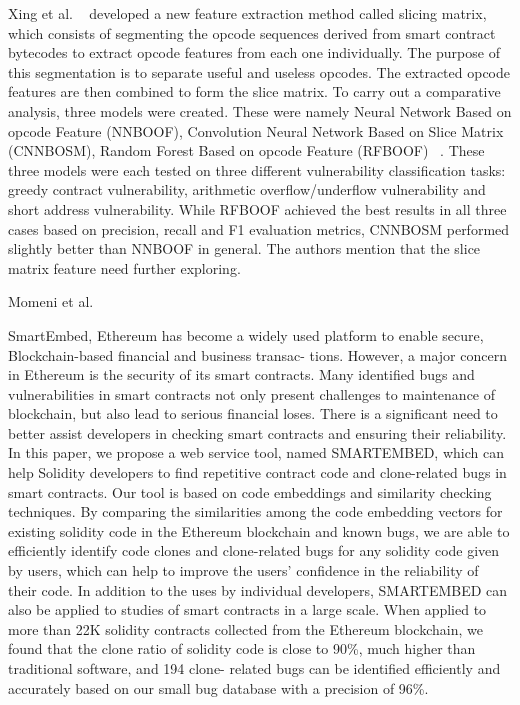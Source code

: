 Xing et al. ~\cite{hu2021comprehensive} developed a new feature extraction method called slicing matrix, which consists of segmenting the opcode sequences derived from
smart contract bytecodes to extract opcode features from each one individually.
The purpose of this segmentation is to separate useful and useless opcodes.
The extracted opcode features are then combined to form the slice matrix.
To carry out a comparative analysis, three models were created.
These were namely Neural Network Based on opcode Feature (NNBOOF), Convolution Neural Network Based on Slice Matrix (CNNBOSM), Random Forest Based on opcode Feature
(RFBOOF) ~\cite{hu2021comprehensive}.
These three models were each tested on three different vulnerability classification tasks: greedy contract vulnerability, arithmetic overflow/underflow vulnerability and short address vulnerability.
While RFBOOF achieved the best results in all three cases based on precision, recall and F1 evaluation metrics, CNNBOSM performed slightly better than NNBOOF in general.
The authors mention that the slice matrix feature need further exploring.

Momeni et al.

SmartEmbed, Ethereum has become a widely used platform to enable secure, Blockchain-based financial and business transac- tions. However, a major concern in Ethereum is the security of its smart contracts. Many identified bugs and vulnerabilities in smart contracts not only present challenges to maintenance of blockchain, but also lead to serious financial loses. There is a significant need to better assist developers in checking smart contracts and ensuring their reliability. In this paper, we propose a web service tool, named SMARTEMBED, which can help Solidity developers to find repetitive contract code and clone-related bugs in smart contracts. Our tool is based on code embeddings and similarity checking techniques. By comparing the similarities among the code embedding vectors for existing solidity code in the Ethereum blockchain and known bugs, we are able to efficiently identify code clones and clone-related bugs for any solidity code given by users, which can help to improve the users’ confidence in the reliability of their code. In addition to the uses by individual developers, SMARTEMBED can also be applied to studies of smart contracts in a large scale. When applied to more than 22K solidity contracts collected from the Ethereum blockchain, we found that the clone ratio of solidity code is close to 90\%, much higher than traditional software, and 194 clone- related bugs can be identified efficiently and accurately based on our small bug database with a precision of 96\%.

